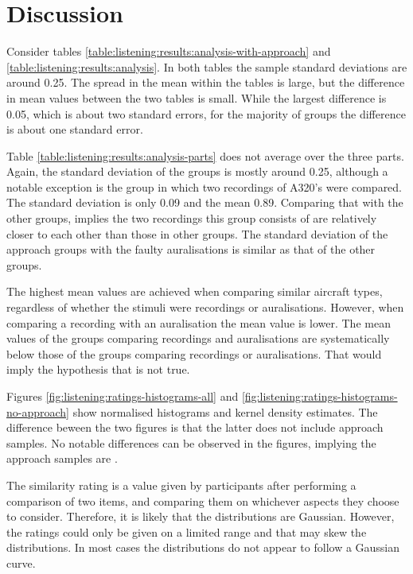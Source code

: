 \documentclass[10pt,twocolumn]{article}
\begin{document}
\section{Discussion}
Consider tables \ref{table:listening:results:analysis-with-approach} and
\ref{table:listening:results:analysis}. In both tables the sample
standard deviations are around 0.25. The spread in the mean within the tables is
large, but the difference in mean values between the two tables is small. While
the largest difference is 0.05, which is about two standard errors, for the
majority of groups the difference is about one standard error.

Table \ref{table:listening:results:analysis-parts} does not average over the
three parts. Again, the standard deviation of the groups is mostly around 0.25,
although a notable exception is the group in which two recordings of A320's were
compared. The standard deviation is only 0.09 and the mean 0.89. Comparing that
with the other groups, implies the two recordings this group consists of are
relatively closer to each other than those in other groups. The standard
deviation of the approach groups with the faulty auralisations is similar as
that of the other groups.

The highest mean values are achieved when comparing similar aircraft types,
regardless of whether the stimuli were recordings or auralisations. However,
when comparing a recording with an auralisation the mean value is lower. The
mean values of the groups comparing recordings and auralisations are
systematically below those of the groups comparing recordings or auralisations.
That would imply the hypothesis that  is not true.

Figures \ref{fig:listening:ratings-histograms-all} and
\ref{fig:listening:ratings-histograms-no-approach} show normalised histograms
and kernel density estimates. The difference beween the two figures is that the
latter does not include approach samples. No notable differences can be observed
in the figures, implying the approach samples are .


The similarity rating is a value given by participants after performing a
comparison of two items, and comparing them on whichever aspects they choose to
consider. Therefore, it is likely that the distributions are Gaussian. However,
the ratings could only be given on a limited range and that may skew the
distributions. In most cases the distributions do not appear to follow a Gaussian curve.
\end{document}
